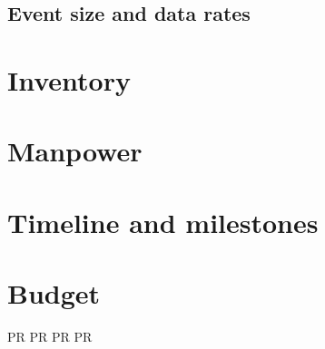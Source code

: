\documentclass{article}
\begin{document}
\subsection{Event size and data rates}
\section{Inventory}

\section{Manpower}

\section{Timeline and milestones}

\section{Budget}
\begin{thebibliography}{9}
 PR
 PR
 PR
 PR
\end{thebibliography}
\end{document}
